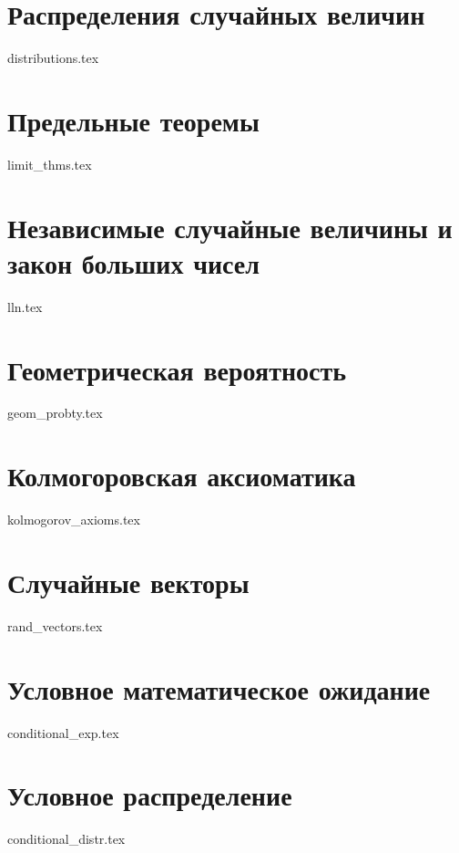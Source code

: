 \documentclass{book}
\theoremstyle{mydef}
\theoremstyle{myth}
\begin{document}
\section{Распределения случайных величин}

{distributions.tex}

\section{Предельные теоремы}

{limit_thms.tex}

\section{Независимые случайные величины и закон больших чисел}

{lln.tex}

\section{Геометрическая вероятность}

{geom_probty.tex}

\section{Колмогоровская аксиоматика}

{kolmogorov_axioms.tex}

\section{Случайные векторы}

{rand_vectors.tex}

\section{Условное математическое ожидание}

{conditional_exp.tex}

\section{Условное распределение}

{conditional_distr.tex}
\end{document}
